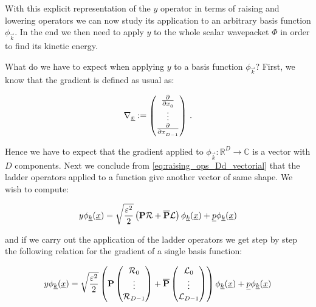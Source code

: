 With this explicit representation of the $y$ operator in terms of raising
and lowering operators we can now study its application to an arbitrary
basis function $\phi_{\vec{k}}$. In the end we then need to apply $y$ to the
whole scalar wavepacket $\Phi$ in order to find its kinetic energy.

What do we have to expect when applying $y$ to a basis function $\phi_{\vec{k}}$?
First, we know that the gradient is defined as usual as:

\begin{equation*}
  \nabla_{\underline{x}} :=
  \begin{pmatrix}
    \frac{\partial^{}}{\partial x_0^{}} \\
    \vdots \\
    \frac{\partial^{}}{\partial x_{D-1}^{}} \\
  \end{pmatrix} \,.
\end{equation*}

Hence we have to expect that the gradient applied to $\phi_{\vec{k}}:\mathbb{R}^D\rightarrow\mathbb{C}$
is a vector with $D$ components. Next we conclude from \eqref{eq:raising_ops_Dd_vectorial} that the
ladder operators applied to a function give another vector of same shape. We wish to compute:

\begin{equation*}
  y \phi_{\underline{k}}(\underline{x}) = \sqrt{\frac{\varepsilon^2}{2}} \left( \mathbf{P}\mathcal{R} + \overline{\mathbf{P}} \mathcal{L} \right) \phi_{\underline{k}}(\underline{x})
                              + \underline{p} \phi_{\underline{k}}(\underline{x})
\end{equation*}

and if we carry out the application of the ladder operators we get step by step
the following relation for the gradient of a single basis function:

\begin{equation*}
  y \phi_{\underline{k}}(\underline{x}) =
  \sqrt{\frac{\varepsilon^2}{2}} \left(
  \mathbf{P}
    \begin{pmatrix}
      \mathcal{R}_0 \\
      \vdots \\
      \mathcal{R}_{D-1}
    \end{pmatrix}
  + \overline{\mathbf{P}}
    \begin{pmatrix}
      \mathcal{L}_0 \\
      \vdots \\
      \mathcal{L}_{D-1}
    \end{pmatrix}
  \right) \phi_{\underline{k}}(\underline{x})
  + \underline{p} \phi_{\underline{k}}(\underline{x})
\end{equation*}


